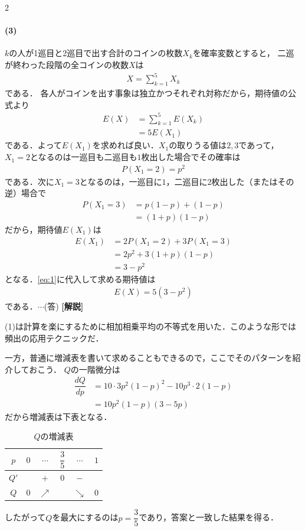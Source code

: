 \documentclass[../../main.tex]{subfiles}
\begin{document}
\begin{multicols}{2}
  \paragraph{(3)}
  $k$の人が1巡目と2巡目で出す合計のコインの枚数$X_k$を確率変数とすると，
  二巡が終わった段階の全コインの枚数$X$は
  \begin{align}
    X = \sum_{k=1}^{5} X_{k}
  \end{align}
  である．
  各人がコインを出す事象は独立かつそれぞれ対称だから，期待値の公式より
  \begin{align}
    E(X)
    & = \sum_{k=1}^{5}E(X_{k})        \\
    & = 5E(X_{1}) \label{eq:1}
  \end{align}
  である．よって$E(X_{1})$を求めれば良い．$X_{1}$の取りうる値は$2,3$であって，
  $X_{1}=2$となるのは一巡目も二巡目も$1$枚出した場合でその確率は
  \begin{align}
    P(X_{1}=2) = p^2
  \end{align}
  である．次に$X_{1}=3$となるのは，一巡目に$1$，二巡目に$2$枚出した（またはその逆）場合で
  \begin{align}
    P(X_{1}=3)
    & = p(1-p) + (1-p) \\
    & = (1+p)(1-p)
  \end{align}
  だから，期待値$E(X_{1})$は
  \begin{align}
    E(X_{1})
    & = 2P(X_{1}=2) + 3P(X_{1}=3) \\
    & = 2p^2 + 3(1+p)(1-p)        \\
    & = 3-p^2
  \end{align}
  となる．\cref{eq:1}に代入して求める期待値は
  \begin{align}
    E(X) = 5(3-p^2)
  \end{align}
  である．$\cdots$(答)
  {\bf [解説]}

  (1)は計算を楽にするために相加相乗平均の不等式を用いた．このような形では頻出の応用テクニックだ．

  一方，普通に増減表を書いて求めることもできるので，ここでそのパターンを紹介しておこう．
  $Q$の一階微分は
  \begin{align}
    \dfrac{dQ}{dp}
    & = 10 \cdot 3p^2(1-p)^2 - 10p^3 \cdot 2(1-p) \\
    & = 10p^2(1-p)(3-5p)
  \end{align}
  だから増減表は下表となる．

  \begin{table}[H]
    \centering
    \caption{$Q$の増減表}
    \label{2000-3:table:2}
    \begin{tabular}{|c||c|c|c|c|c|}
      \hline
      $p$  & $0$ & $\cdots$   & $\dfrac{3}{5}$ & $\cdots$   & $1$ \\
      \hline
      $Q'$ &     & $+$        & $0$           & $-$        &     \\
      \hline
      $Q$  & $0$ & $\nearrow$ &               & $\searrow$ & $0$ \\
      \hline
    \end{tabular}
  \end{table}
  したがって$Q$を最大にするのは$p=\dfrac{3}{5}$であり，答案と一致した結果を得る．

  \newpage
\end{multicols}
\end{document}
